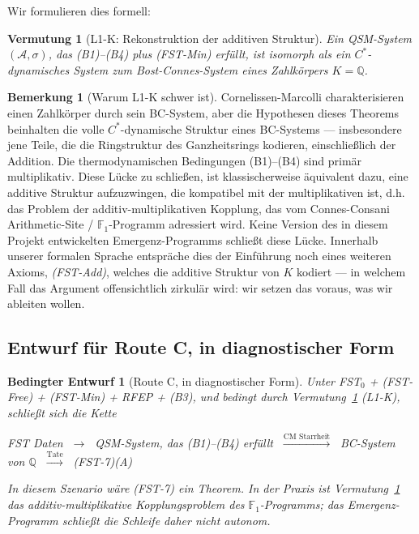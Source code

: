 \documentclass[11pt,a4paper]{article}
\theoremstyle{plain}
\newtheorem{conjecture}[theorem]{Vermutung}
\newtheorem{blueprint}[theorem]{Bedingter Entwurf}
\theoremstyle{definition}
\newtheorem{remark}[theorem]{Bemerkung}
\newcommand{\Q}{\mathbb{Q}}
\newcommand{\F}{\mathbb{F}}
\begin{document}
Wir formulieren dies formell:

\begin{conjecture}[L1-K: Rekonstruktion der additiven Struktur]
\label{conj:l1k}
Ein QSM-System $(\mathcal A, \sigma)$, das (B1)--(B4) plus
(FST-Min) erfüllt, ist isomorph als ein $C^\ast$-dynamisches System zum
Bost-Connes-System eines Zahlkörpers $K = \Q$.
\end{conjecture}

\begin{remark}[Warum L1-K schwer ist]\label{rem:l1k-hard}
Cornelissen-Marcolli charakterisieren einen Zahlkörper durch sein BC-System,
aber die Hypothesen dieses Theorems beinhalten die volle
$C^\ast$-dynamische Struktur eines BC-Systems --- insbesondere jene Teile,
die die Ringstruktur des Ganzheitsrings kodieren, einschließlich der Addition.
Die thermodynamischen Bedingungen (B1)--(B4) sind primär multiplikativ.
Diese Lücke zu schließen, ist klassischerweise äquivalent dazu, eine additive
Struktur aufzuzwingen, die kompatibel mit der multiplikativen ist, d.h. das Problem
der additiv-multiplikativen Kopplung, das vom Connes-Consani Arithmetic-Site /
$\F_1$-Programm adressiert wird. Keine Version des in diesem Projekt entwickelten
Emergenz-Programms schließt diese Lücke. Innerhalb unserer formalen Sprache
entspräche dies der Einführung noch eines weiteren Axioms, \emph{(FST-Add)},
welches die additive Struktur von $K$ kodiert --- in welchem Fall das Argument
offensichtlich zirkulär wird: wir setzen das voraus, was wir ableiten wollen.
\end{remark}

\subsection{Entwurf für Route C, in diagnostischer Form}

\begin{blueprint}[Route C, in diagnostischer Form]
\label{bp:route-c}
Unter FST$_0$ + (FST-Free) + (FST-Min) + RFEP + (B3), \emph{und
bedingt durch Vermutung~\ref{conj:l1k} (L1-K)}, schließt sich die Kette
\begin{center}
FST Daten $\;\to\;$ QSM-System, das (B1)--(B4) erfüllt
$\;\xrightarrow{\text{CM Starrheit}}\;$ BC-System von $\Q$
$\;\xrightarrow{\text{Tate}}\;$ (FST-7)(A)
\end{center}
In diesem Szenario wäre (FST-7) ein Theorem. In der Praxis ist
Vermutung~\ref{conj:l1k} das additiv-multiplikative Kopplungsproblem
des $\F_1$-Programms; das Emergenz-Programm schließt die Schleife daher
\emph{nicht} autonom.
\end{blueprint}
\end{document}
